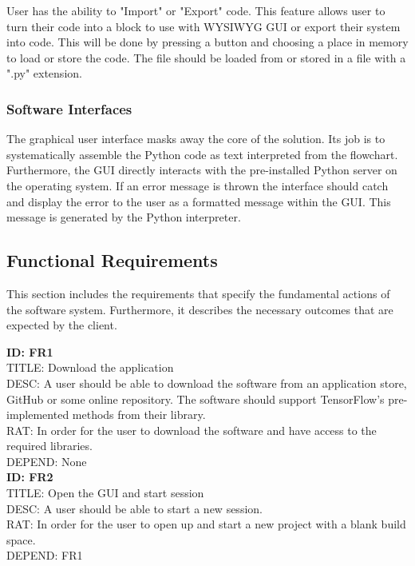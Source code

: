 \documentclass[journal,10pt,onecolumn,compsoc]{IEEEtran} \usepackage[margin=1.0in]{geometry} \usepackage{pdfpages} \usepackage{graphicx}
\begin{document}
\noindent User has the ability to "Import" or "Export" code.
This feature allows user to turn their code into a block to use with WYSIWYG GUI or export their system into code.
This will be done by pressing a button and choosing a place in memory to load or store the code. 
The file should be loaded from or stored in a file with a ".py" extension.

\subsubsection{Software Interfaces}

The graphical user interface masks away the core of the solution. Its job is to systematically assemble the Python code as text interpreted from the flowchart.
Furthermore, the GUI directly interacts with the pre-installed Python server on the operating system.
If an error message is thrown the interface should catch and display the error to the user as a formatted message within the GUI.
This message is generated by the Python interpreter.

\subsection{Functional Requirements}

This section includes the requirements that specify the fundamental actions of the software system.
Furthermore, it describes the necessary outcomes that are expected by the client.

\noindent
\textbf{ID: FR1}\\
TITLE: Download the application\\
DESC: A user should be able to download the software from an application store, GitHub or some online repository. 
The software should support TensorFlow\texttrademark's pre-implemented methods from their library. \\
RAT: In order for the user to download the software and have access to the required libraries.\\
DEPEND: None\\

\noindent
\textbf{ID: FR2}\\
TITLE: Open the GUI and start session\\
DESC: A user should be able to start a new session. \\
RAT: In order for the user to open up and start a new project with a blank build space.\\
DEPEND: FR1\\
\end{document}

